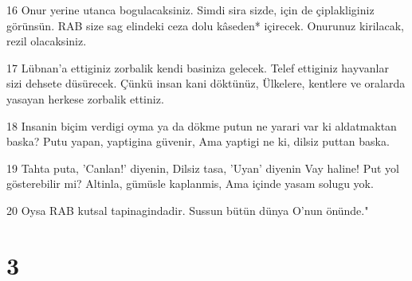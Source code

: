 \par 16 Onur yerine utanca bogulacaksiniz. Simdi sira sizde, için de çiplakliginiz görünsün. RAB size sag elindeki ceza dolu kâseden* içirecek. Onurunuz kirilacak, rezil olacaksiniz.
\par 17 Lübnan'a ettiginiz zorbalik kendi basiniza gelecek. Telef ettiginiz hayvanlar sizi dehsete düsürecek. Çünkü insan kani döktünüz, Ülkelere, kentlere ve oralarda yasayan herkese zorbalik ettiniz.
\par 18 Insanin biçim verdigi oyma ya da dökme putun ne yarari var ki aldatmaktan baska? Putu yapan, yaptigina güvenir, Ama yaptigi ne ki, dilsiz puttan baska.
\par 19 Tahta puta, 'Canlan!' diyenin, Dilsiz tasa, 'Uyan' diyenin Vay haline! Put yol gösterebilir mi? Altinla, gümüsle kaplanmis, Ama içinde yasam solugu yok.
\par 20 Oysa RAB kutsal tapinagindadir. Sussun bütün dünya O'nun önünde."

\chapter{3}

